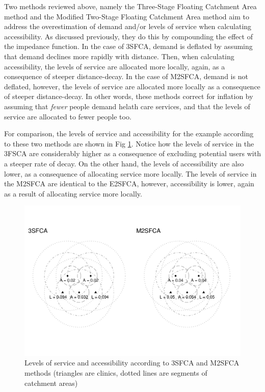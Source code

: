 \documentclass[10pt,letterpaper]{article}
\begin{document}
Two methods reviewed above, namely the Three-Stage Floating Catchment
Area method and the Modified Two-Stage Floating Catchment Area method
aim to address the overestimation of demand and/or levels of service
when calculating accessibility. As discussed previously, they do this by
compounding the effect of the impedance function. In the case of 3SFCA,
demand is deflated by assuming that demand declines more rapidly with
distance. Then, when calculating accessibility, the levels of service
are allocated more locally, again, as a consequence of steeper
distance-decay. In the case of M2SFCA, demand is not deflated, however,
the levels of service are allocated more locally as a consequence of
steeper distance-decay. In other words, these methods correct for
inflation by assuming that \emph{fewer} people demand helath care
services, and that the levels of service are allocated to fewer people
too.

For comparison, the levels of service and accessibility for the example
according to these two methods are shown in Fig
\ref{fig:fig5-example-5}. Notice how the levels of service in the 3FSCA
are considerably higher as a consequence of excluding potential users
with a steeper rate of decay. On the other hand, the levels of
accessibility are also lower, as a consequence of allocating service
more locally. The levels of service in the M2SFCA are identical to the
E2SFCA, however, accessibility is lower, again as a result of allocating
service more locally.

\begin{figure}
\includegraphics[width=0.95\linewidth]{Supply_and_Demand_Inflation_in_FCA_Methods_v2.1_files/figure-latex/fig5-example-5-1} \caption{\label{fig:fig5-example-5}Levels of service and accessibility according to 3SFCA and M2SFCA methods (triangles are clinics, dotted lines are segments of catchment areas)}\label{fig:fig5-example-5}
\end{figure}
\end{document}
